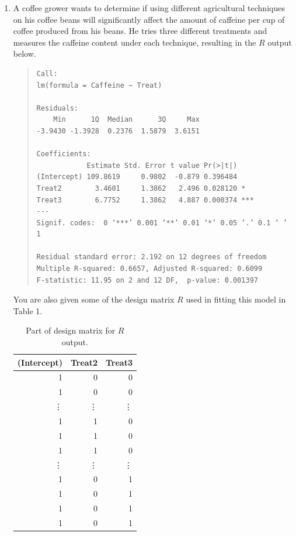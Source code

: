 \documentclass{article}
\begin{document}
\begin{enumerate}


\item A coffee grower wants to determine if 
using different agricultural techniques on his coffee beans
will significantly affect the amount of caffeine
per cup of coffee produced from his beans. He tries
three different treatments and measures
the caffeine content under each technique, resulting
in the $R$ output below.

  \begin{quote}
\begin{verbatim}
Call:
lm(formula = Caffeine ~ Treat)

Residuals:
    Min      1Q  Median      3Q     Max 
-3.9430 -1.3928  0.2376  1.5879  3.6151 

Coefficients:
            Estimate Std. Error t value Pr(>|t|)    
(Intercept) 109.8619     0.9802  -0.879 0.396484    
Treat2        3.4601     1.3862   2.496 0.028120 *  
Treat3        6.7752     1.3862   4.887 0.000374 ***
---
Signif. codes:  0 ‘***’ 0.001 ‘**’ 0.01 ‘*’ 0.05 ‘.’ 0.1 ‘ ’ 1 

Residual standard error: 2.192 on 12 degrees of freedom
Multiple R-squared: 0.6657,	Adjusted R-squared: 0.6099 
F-statistic: 11.95 on 2 and 12 DF,  p-value: 0.001397 
\end{verbatim}
  \end{quote}

You are also given some of the design matrix $R$ used in fitting this
model in Table 1.
  \begin{table}
    \centering
    \begin{tabular}{rrr}
   (Intercept) & Treat2 & Treat3 \\ \hline
            1 &  0 &  0 \\
            1 & 0 & 0 \\
            \vdots & \vdots & \vdots \\
            1 & 1 & 0 \\
            1 & 1 & 0 \\
           1 & 1  & 0 \\
            \vdots & \vdots & \vdots \\
           1 & 0  & 1 \\
           1 & 0  & 1 \\
           1 & 0  & 1 \\
          1  & 0  & 1 \\
    \end{tabular}
    \caption{Part of design matrix for $R$ output.}
    \label{tab2}
  \end{table}


\end{enumerate}
\end{document}
